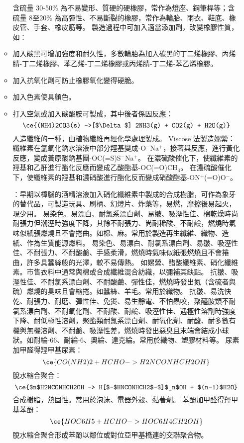 \documentclass[a4paper,12pt]{report}
\begin{document}
\begin{itemize}
\begin{itemize}
含硫量 30-50\% 為不易變形、質硬的硬橡膠，常作為燈座、鋼筆桿等；含硫量 8至20\% 為高彈性、不易斷裂的橡膠，常作為輪胎、雨衣、鞋底、橡皮管、手套、橡皮筋等。
製造過程中可加入適當添加劑，改變橡膠性質，如：
\bit
\item 加入碳黑可增加強度和耐久性，多數輪胎為加入碳黑的丁二烯橡膠、丙烯腈-丁二烯橡膠、苯乙烯-丁二烯橡膠或丙烯腈-丁二烯-苯乙烯橡膠。
\item 加入抗氧化劑可防止橡膠氧化變得硬脆。
\item 加入色素使具顏色。
\item 打入空氣或加入碳酸胺可製成，其中後者係因反應：
\[\ce{(NH4)2CO3(s) ->[$\Delta$] 2NH3(g) + CO2(g) + H2O(g)}\]
\eit
{}
人造纖維的一種，由植物纖維再經化學處理製成。
Viscose 法製造嫘縈：纖維素在氫氧化鈉水溶液中部分羥基變成-O$^-$Na$^+$，接著與反應，進行黃化反應，變成黃原酸鈉基團-OC(=S)S$^-$Na$^+$。
在濃硫酸催化下，使纖維素的羥基和乙酐進行酯化反應而變成乙酸酯基-OC(=O)CH$_3$。
在濃硫酸催化下，使纖維素的羥基和濃硝酸進行酯化反而變成硝酸酯基-ON$^+$(=O)O$^-$。

：早期以樟腦的酒精溶液加入硝化纖維素中製成的合成樹脂，可作為象牙的替代品，可製造玩具、刷柄、幻燈片、炸藥等，易燃，摩擦後易起火，現少用。
易染色、易漂白、耐氯系漂白劑、易皺、吸溼性佳、棉乾燥時尚耐張力但潮溼時強度下降，其餘不耐張力、尚耐稀酸、不耐鹼，燃燒時氣味似紙張燃燒且不會捲曲。如棉、麻。常用於製造再生纖維、織物、造紙、作為生質能源燃料。
易染色、易漂白、耐氯系漂白劑、易皺、吸溼性佳、不耐張力、不耐酸鹼、手感柔滑，燃燒時氣味似紙張燃燒且不會捲曲，許多具蠶絲般的光澤，較不易傳熱。 如嫘縈、醋酸纖維素、硝化纖維素。市售衣料中通常與棉或合成纖維混合紡織，以彌補其缺點。
抗皺、吸溼性佳、不耐氯系漂白劑、不耐酸鹼、彈性佳，燃燒時發出氮（含硫者與硫）燃燒的臭味且會縮捲。如蠶絲、羊毛。常用於織物。
抗皺、易洗快乾、耐張力、耐磨、彈性佳、免燙、易生靜電、不怕蟲咬，聚醯胺類不耐氯系漂白劑、不耐氧化劑、不耐酸、耐鹼、吸溼性佳、遇極性溶劑時強度下降、耐低極性溶劑，聚酯類耐氯系漂白劑、耐氧化劑、耐酸、耐多數有機與無機溶劑、不耐鹼、吸溼性差，燃燒時發出惡臭且末端會結成小球狀。如耐綸-66、耐綸-6、奧綸、達克綸。常用於織物、塑膠材料等。
尿素加甲醛得羥甲基尿素：
\[\ce{CO(NH2)2 + HCHO -> H2NCONHCH2OH}\]
脫水縮合聚合：
\[\ce{$n$H2NCONHCH2OH -> H[$-$HNCONHCH2$-$]$_n$OH + $(n-1)$H2O}\]
合成樹脂，熱固性。常用於泡沫、電器外殼、黏著劑。
苯酚加甲醛得羥甲基苯酚：
\[\ce{HOC6H5 + HCHO -> HOC6H4CH2OH}\]
脫水縮合聚合形成苯酚以鄰位或對位亞甲基橋連的交聯聚合物。


\end{itemize}
\end{itemize}
\end{document}
